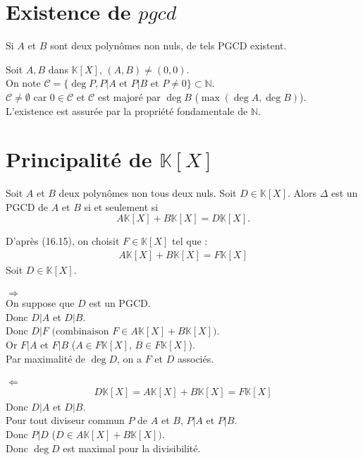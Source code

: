 \documentclass[../main.tex]{subfiles}
\begin{document}
\setcounter{section}{16}
\section{Existence de $pgcd$}
\begin{tcolorbox}[title=Propostion 16.17, title filled=false, colframe=lightblue, colback=lightblue!10!white]
    Si $A$ et $B$ sont deux polynômes non nuls, de tels PGCD existent. 
\end{tcolorbox}

\noindent Soit $A, B$ dans $\mathbb{K}[X]$, $(A, B) \neq (0, 0)$.  \\
On note $\mathcal{C} = \{ \deg P, P|A \text{ et } P|B \text{ et } P\neq 0 \} \subset \mathbb{N}$. \\
$\mathcal{C} \neq \emptyset$ car $0 \in \mathcal{C}$ et $\mathcal{C}$ est majoré par $\deg B$ ($\max (\deg A, \deg B)$). \\
L'existence est assurée par la propriété fondamentale de $\mathbb{N}$. 

\section{Principalité de $\mathbb{K}[X]$}
\begin{tcolorbox}[title=Propostion 16.18, title filled=false, colframe=lightblue, colback=lightblue!10!white]
    Soit $A$ et $B$ deux polynômes non tous deux nuls. Soit $D \in \mathbb{K}[X]$. Alors $\Delta$ est un PGCD de $A$ et $B$ si et seulement si 
    $$A \mathbb{K}[X] + B \mathbb{K}[X] = D \mathbb{K}[X].$$
\end{tcolorbox}

\noindent D'après (16.15), on choisit $F \in \mathbb{K}[X]$ tel que :
\begin{align*}
    A \mathbb{K}[X] + B \mathbb{K}[X] = F \mathbb{K}[X]
\end{align*}
Soit $D \in \mathbb{K}[X]$. \\ \\

$\boxed{\Rightarrow}$ \\
On suppose que $D$ est un PGCD. \\
Donc $D|A$ et $D|B$. \\
Donc $D|F \text{ (combinaison $F \in A \mathbb{K}[X] + B \mathbb{K}[X]$)}$. \\
Or $F|A$ et $F|B$ ($A \in F \mathbb{K}[X]$, $B \in F \mathbb{K}[X]$). \\
Par maximalité de $\deg D$, on a $F$ et $D$ associés. \\ \\

$\boxed{\Leftarrow}$ \\
\begin{align*}
    D \mathbb{K}[X] = A \mathbb{K}[X] + B \mathbb{K}[X] = F \mathbb{K}[X]
\end{align*}
Donc $D|A$ et $D|B$. \\
Pour tout diviseur commun $P$ de $A$ et $B$, $P|A$ et $P|B$. \\
Donc $P|D$ ($D \in A \mathbb{K}[X] + B \mathbb{K}[X])$. \\
Donc $\deg D$ est maximal pour la divisibilité. 
\end{document}
